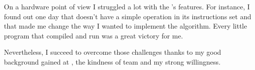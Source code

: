 On a hardware point of view I struggled a lot with the \vc{}'s features. For instance, I found out one day that \qpu{} doesn't have a simple  operation in its instructions set and that made me change the way I wanted to implement the algorithm. Every little  program that compiled and run was a great victory for me.

Nevertheless, I succeed to overcome those challenges thanks to my good background gained at \deptname{}, the kindness of \groupname{} team and my strong willingness.















